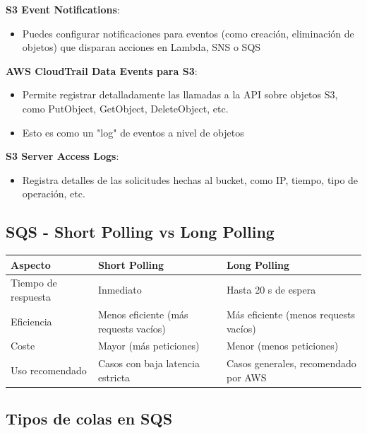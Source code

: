 \documentclass[12pt,a4paper]{report}
\begin{document}
\textbf{S3 Event Notifications}:
\begin{itemize}
    \item Puedes configurar notificaciones para eventos (como creación, eliminación de objetos) que disparan acciones en Lambda, SNS o SQS
\end{itemize}

\textbf{AWS CloudTrail Data Events para S3}:
\begin{itemize}
    \item Permite registrar detalladamente las llamadas a la API sobre objetos S3, como PutObject, GetObject, DeleteObject, etc.
    \item Esto es como un "log" de eventos a nivel de objetos
\end{itemize}

\textbf{S3 Server Access Logs}:
\begin{itemize}
    \item Registra detalles de las solicitudes hechas al bucket, como IP, tiempo, tipo de operación, etc.
\end{itemize}

\subsection{SQS - Short Polling vs Long Polling}

\begin{center}
\begin{longtable}{|p{3cm}|p{5cm}|p{5cm}|}
\hline
\cellcolor{awsblue!20}\textbf{Aspecto} & \cellcolor{awsblue!20}\textbf{Short Polling} & \cellcolor{awsblue!20}\textbf{Long Polling} \\
\hline
Tiempo de respuesta & Inmediato & Hasta 20 s de espera \\
\hline
Eficiencia & Menos eficiente (más requests vacíos) & Más eficiente (menos requests vacíos) \\
\hline
Coste & Mayor (más peticiones) & Menor (menos peticiones) \\
\hline
Uso recomendado & Casos con baja latencia estricta & Casos generales, recomendado por AWS \\
\hline
\end{longtable}
\end{center}

\subsection{Tipos de colas en SQS}
\end{document}
